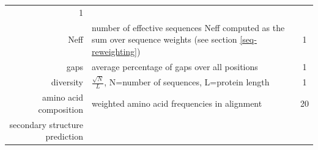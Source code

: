 \documentclass[12pt,a4paper,twoside]{book}
\theoremstyle{definition}
\theoremstyle{definition}
\theoremstyle{remark}
\begin{document}
\begin{longtable}[]{@{}rlc@{}}
\begin{minipage}[t]{0.18\columnwidth}
1\strut
\end{minipage}\tabularnewline
\begin{minipage}[t]{0.23\columnwidth}\raggedleft\strut
Neff\strut
\end{minipage} & \begin{minipage}[t]{0.50\columnwidth}\raggedright\strut
number of effective sequences Neff computed as the sum over sequence
weights (see section \ref{seq-reweighting})\strut
\end{minipage} & \begin{minipage}[t]{0.18\columnwidth}\centering\strut
1\strut
\end{minipage}\tabularnewline
\begin{minipage}[t]{0.23\columnwidth}\raggedleft\strut
gaps\strut
\end{minipage} & \begin{minipage}[t]{0.50\columnwidth}\raggedright\strut
average percentage of gaps over all positions\strut
\end{minipage} & \begin{minipage}[t]{0.18\columnwidth}\centering\strut
1\strut
\end{minipage}\tabularnewline
\begin{minipage}[t]{0.23\columnwidth}\raggedleft\strut
diversity\strut
\end{minipage} & \begin{minipage}[t]{0.50\columnwidth}\raggedright\strut
\(\frac{\sqrt{N}}{L}\), N=number of sequences, L=protein length\strut
\end{minipage} & \begin{minipage}[t]{0.18\columnwidth}\centering\strut
1\strut
\end{minipage}\tabularnewline
\begin{minipage}[t]{0.23\columnwidth}\raggedleft\strut
amino acid composition\strut
\end{minipage} & \begin{minipage}[t]{0.50\columnwidth}\raggedright\strut
weighted amino acid frequencies in alignment\strut
\end{minipage} & \begin{minipage}[t]{0.18\columnwidth}\centering\strut
20\strut
\end{minipage}\tabularnewline
\begin{minipage}[t]{0.23\columnwidth}\raggedleft\strut
secondary structure prediction\strut
\end{minipage} & \begin{minipage}[t]{0.50\columnwidth}\raggedright\strut

\end{minipage}
\end{longtable}
\end{document}
